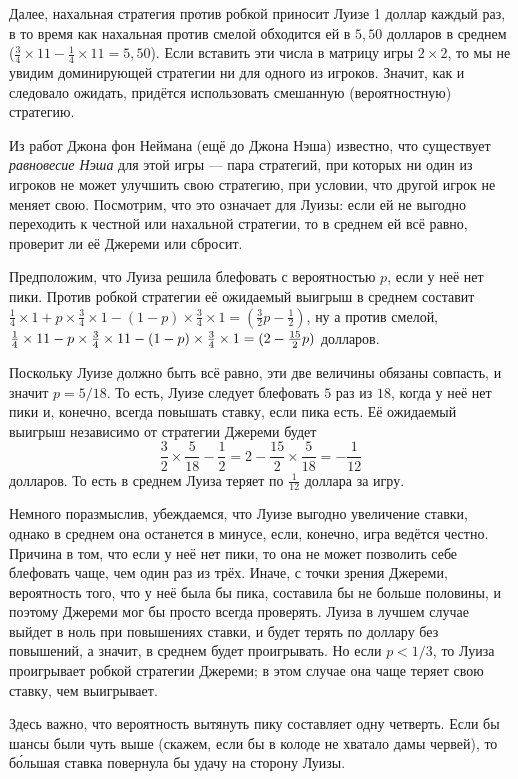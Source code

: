 Далее, нахальная стратегия против робкой приносит Луизе 1 доллар каждый раз,
в то время как нахальная против смелой обходится ей в $5{,}50$ долларов в среднем ($\tfrac34 \times 11- \tfrac14 \times11 = 5{,}50$).
Если вставить эти числа в матрицу игры $2 \times 2$,
то мы не увидим доминирующей стратегии ни для одного из игроков.
Значит, как и следовало ожидать, придётся использовать смешанную (вероятностную) стратегию.

Из работ Джона фон Неймана (ещё до Джона Нэша) известно, что существует \emph{равновесие Нэша} для этой игры --- пара стратегий, при которых ни один из игроков не может улучшить свою стратегию, при условии, что другой игрок не меняет свою.
Посмотрим, что это означает для Луизы: если ей не выгодно переходить к честной или нахальной стратегии, то в среднем ей всё равно, проверит ли её Джереми или сбросит.

Предположим, что Луиза решила блефовать с вероятностью $p$, если у неё нет пики.
Против робкой стратегии её ожидаемый выигрыш в среднем составит $\tfrac14 \times 1 + p \times \tfrac34 \times 1 - (1 - p) \times \tfrac34 \times 1 =(\tfrac32p - \tfrac12)$,
ну а против смелой, $\tfrac14 \times 11 - p \times \tfrac34 \times 11 - (1 - p) \times \tfrac34 \times 1 \z= (2 - \tfrac{15}2p)$ долларов.

Поскольку Луизе должно быть всё равно, эти две величины обязаны совпасть, и значит $p = 5/18$.
То есть, Луизе следует блефовать $5$ раз из $18$, когда у неё нет пики и, конечно, всегда повышать ставку, если пика есть.
Её ожидаемый выигрыш независимо от стратегии Джереми будет
\[\frac32\times\frac5{18}-\frac12=2-\frac{15}2\times\frac5{18}=-\frac1{12}\]
долларов.
То есть в среднем Луиза теряет по $\tfrac1{12}$ доллара за игру.

Немного поразмыслив, убеждаемся, что Луизе выгодно увеличение ставки,
однако в среднем она останется в минусе, если, конечно, игра ведётся честно.
Причина в том, что если у неё нет пики, то она не может позволить себе блефовать чаще, чем один раз из трёх.
Иначе, с точки зрения Джереми, вероятность того, что у неё была бы пика, составила бы не больше половины, и поэтому Джереми мог бы просто всегда проверять.
Луиза в лучшем случае выйдет в ноль при повышениях ставки, и будет терять по доллару без повышений, а значит, в среднем будет проигрывать.
Но если $p < 1/3$, то Луиза проигрывает робкой стратегии Джереми;
в этом случае она чаще теряет свою ставку, чем выигрывает.

Здесь важно, что вероятность вытянуть пику составляет одну четверть.
Если бы шансы были чуть выше (скажем, если бы в колоде не хватало дамы червей), то б\'{о}льшая ставка повернула бы удачу на сторону Луизы.

